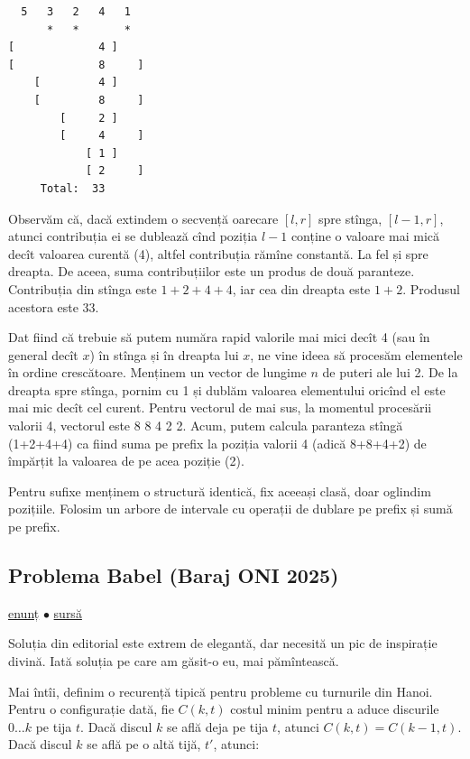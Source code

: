 \begin{verbatim}
  5   3   2   4   1
      *   *       *
[             4 ]
[             8     ]
    [         4 ]
    [         8     ]
        [     2 ]
        [     4     ]
            [ 1 ]
            [ 2     ]
     Total:  33
\end{verbatim}

Observăm că, dacă extindem o secvență oarecare $[l,r]$ spre stînga, $[l-1,r]$, atunci contribuția ei se dublează cînd poziția $l-1$ conține o valoare mai mică decît valoarea curentă (4), altfel contribuția rămîne constantă. La fel și spre dreapta. De aceea, suma contribuțiilor este un produs de două paranteze. Contribuția din stînga este $1+2+4+4$, iar cea din dreapta este $1+2$. Produsul acestora este 33.

Dat fiind că trebuie să putem număra rapid valorile mai mici decît 4 (sau în general decît $x$) în stînga și în dreapta lui $x$, ne vine ideea să procesăm elementele în ordine crescătoare. Menținem un vector de lungime $n$ de puteri ale lui 2. De la dreapta spre stînga, pornim cu 1 și dublăm valoarea elementului oricînd el este mai mic decît cel curent. Pentru vectorul de mai sus, la momentul procesării valorii 4, vectorul este 8 8 4 2 2. Acum, putem calcula paranteza stîngă (1+2+4+4) ca fiind suma pe prefix la poziția valorii 4 (adică 8+8+4+2) de împărțit la valoarea de pe acea poziție (2).

Pentru sufixe menținem o structură identică, fix aceeași clasă, doar oglindim pozițiile. Folosim un arbore de intervale cu operații de dublare pe prefix și sumă pe prefix.

\subsection{Problema Babel (Baraj ONI 2025)}
\label{problem:babel}

\href{https://kilonova.ro/problems/3734}{enunț}
$\bullet$
\hyperref[code:babel]{sursă}

Soluția din editorial este extrem de elegantă, dar necesită un pic de inspirație divină. Iată soluția pe care am găsit-o eu, mai pămîntească.

Mai întîi, definim o recurență tipică pentru probleme cu turnurile din Hanoi. Pentru o configurație dată, fie $C(k, t)$ costul minim pentru a aduce discurile $0 \dots k$ pe tija $t$. Dacă discul $k$ se află deja pe tija $t$, atunci $C(k, t) = C(k - 1, t)$. Dacă discul $k$ se află pe o altă tijă, $t'$, atunci:


